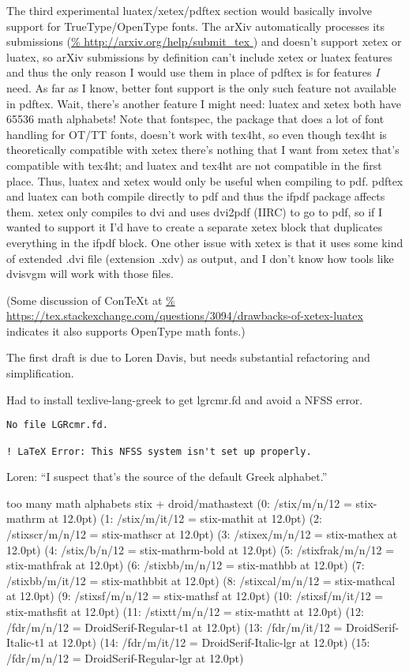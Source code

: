 \documentclass[12pt]{article}
\begin{document}
The third experimental luatex/xetex/pdftex section would basically
involve support for TrueType/OpenType fonts.  The arXiv automatically
processes its submissions (\url{%
  http://arxiv.org/help/submit_tex }) and doesn't support xetex or
luatex, so arXiv submissions by definition can't include xetex or
luatex features and thus the only reason I would use them in place of
pdftex is for features \emph{I} need.  As far as I know, better font
support is the only such feature not available in pdftex.  Wait,
there's another feature I might need: luatex and xetex both have 65536
math alphabets!  Note that fontspec, the package that does a lot of
font handling for OT/TT fonts, doesn't work with tex4ht, so even
though tex4ht is theoretically compatible with xetex there's nothing
that I want from xetex that's compatible with tex4ht; and luatex and
tex4ht are not compatible in the first place.  Thus, luatex and xetex
would only be useful when compiling to pdf.  pdftex and luatex can
both compile directly to pdf and thus the ifpdf package affects them.
xetex only compiles to dvi and uses dvi2pdf (IIRC) to go to pdf, so if
I wanted to support it I'd have to create a separate xetex block that
duplicates everything in the ifpdf block.  One other issue with xetex
is that it uses some kind of extended .dvi file (extension .xdv) as
output, and I don't know how tools like dvisvgm will work with those
files.

(Some discussion of ConTeXt at \url{%
https://tex.stackexchange.com/questions/3094/drawbacks-of-xetex-luatex
} indicates it also supports OpenType math fonts.)

The first draft is due to Loren Davis, but needs substantial
refactoring and simplification.

Had to install texlive-lang-greek to get lgrcmr.fd and avoid a NFSS error.

\begin{lstlisting}
No file LGRcmr.fd.

! LaTeX Error: This NFSS system isn't set up properly.
\end{lstlisting}

Loren: ``I suspect that's the source of the default \mathup Greek
alphabet.''

too many math alphabets
stix + droid/mathastext
(0: /stix/m/n/12 = stix-mathrm at 12.0pt)
(1: /stix/m/it/12 = stix-mathit at 12.0pt)
(2: /stixscr/m/n/12 = stix-mathscr at 12.0pt)
(3: /stixex/m/n/12 = stix-mathex at 12.0pt)
(4: /stix/b/n/12 = stix-mathrm-bold at 12.0pt)
(5: /stixfrak/m/n/12 = stix-mathfrak at 12.0pt)
(6: /stixbb/m/n/12 = stix-mathbb at 12.0pt)
(7: /stixbb/m/it/12 = stix-mathbbit at 12.0pt)
(8: /stixcal/m/n/12 = stix-mathcal at 12.0pt)
(9: /stixsf/m/n/12 = stix-mathsf at 12.0pt)
(10: /stixsf/m/it/12 = stix-mathsfit at 12.0pt)
(11: /stixtt/m/n/12 = stix-mathtt at 12.0pt)
(12: /fdr/m/n/12 = DroidSerif-Regular-t1 at 12.0pt)
(13: /fdr/m/it/12 = DroidSerif-Italic-t1 at 12.0pt)
(14: \LGR/fdr/m/it/12 = DroidSerif-Italic-lgr at 12.0pt)
(15: \LGR/fdr/m/n/12 = DroidSerif-Regular-lgr at 12.0pt)
\end{document}
